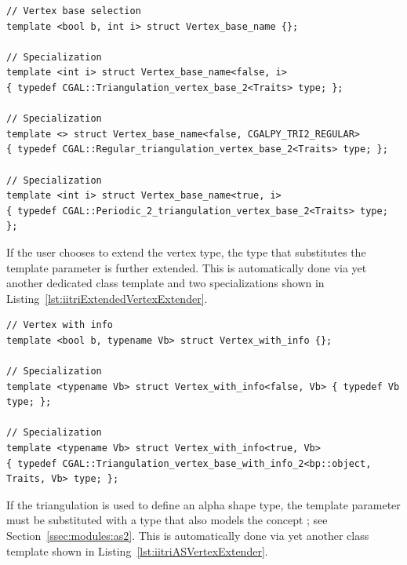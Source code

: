 \begin{lstfloat}
  \begin{lstlisting}[style=cppFramedStyle,basicstyle=\normalsize,%
                     label={lst:iitriBaseVertexExtender},%
                     caption={The 2D Triangulation base vertex type extender.}]
// Vertex base selection
template <bool b, int i> struct Vertex_base_name {};

// Specialization
template <int i> struct Vertex_base_name<false, i>
{ typedef CGAL::Triangulation_vertex_base_2<Traits> type; };

// Specialization
template <> struct Vertex_base_name<false, CGALPY_TRI2_REGULAR>
{ typedef CGAL::Regular_triangulation_vertex_base_2<Traits> type; };

// Specialization
template <int i> struct Vertex_base_name<true, i>
{ typedef CGAL::Periodic_2_triangulation_vertex_base_2<Traits> type; };
  \end{lstlisting}
\end{lstfloat}

If the user chooses to extend the vertex type, the type that substitutes
the  template parameter is further extended. This is
automatically done via yet another dedicated class template and two
specializations shown in Listing~\ref{lst:iitriExtendedVertexExtender}. 

\begin{lstfloat}
  \begin{lstlisting}[style=cppFramedStyle,basicstyle=\normalsize,%
                     label={lst:iitriExtendedVertexExtender},%
                     caption={The 2D Triangulation user extended vertex type extender.}]
// Vertex with info
template <bool b, typename Vb> struct Vertex_with_info {};

// Specialization
template <typename Vb> struct Vertex_with_info<false, Vb> { typedef Vb type; };

// Specialization
template <typename Vb> struct Vertex_with_info<true, Vb>
{ typedef CGAL::Triangulation_vertex_base_with_info_2<bp::object, Traits, Vb> type; };
  \end{lstlisting}
\end{lstfloat}

If the triangulation is used to define an alpha shape type, the template
parameter  must be substituted with a type that also models
the concept ; see 
Section~\ref{ssec:modules:as2}. This is automatically done via yet another 
class template shown in Listing~\ref{lst:iitriASVertexExtender}.

